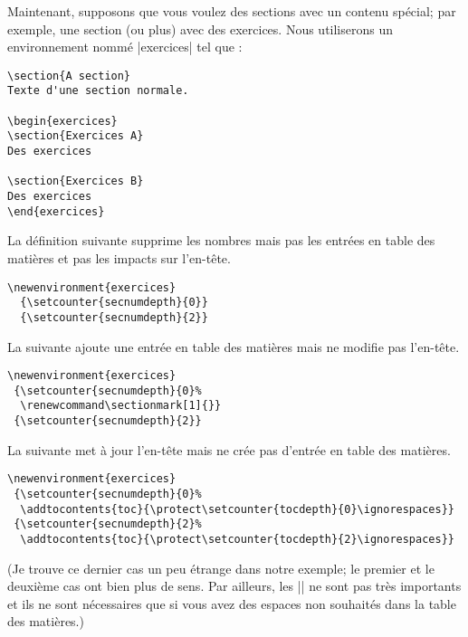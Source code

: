 \documentclass[a4paper]{ltxguide}
\begin{document}
Maintenant, supposons que vous voulez des sections avec un contenu spécial; par exemple,
une section (ou plus) avec des exercices. Nous utiliserons un environnement nommé
|exercices| tel que : 
\begin{verbatim}
\section{A section}
Texte d'une section normale.

\begin{exercices}
\section{Exercices A}
Des exercices

\section{Exercices B}
Des exercices
\end{exercices}
\end{verbatim}

La définition suivante supprime les nombres mais pas les entrées en table des 
matières et pas les impacts sur l'en-tête.
\begin{verbatim}
\newenvironment{exercices}
  {\setcounter{secnumdepth}{0}}
  {\setcounter{secnumdepth}{2}}
\end{verbatim}

La suivante ajoute une entrée en table des matières mais ne modifie pas l'en-tête.
\begin{verbatim}
\newenvironment{exercices}
 {\setcounter{secnumdepth}{0}%
  \renewcommand\sectionmark[1]{}}
 {\setcounter{secnumdepth}{2}}
\end{verbatim}

La suivante met à jour l'en-tête mais ne crée pas d'entrée en table des matières.
\begin{verbatim}
\newenvironment{exercices}
 {\setcounter{secnumdepth}{0}%
  \addtocontents{toc}{\protect\setcounter{tocdepth}{0}\ignorespaces}}
 {\setcounter{secnumdepth}{2}%
  \addtocontents{toc}{\protect\setcounter{tocdepth}{2}\ignorespaces}}
\end{verbatim}
(Je trouve ce dernier cas un peu étrange dans notre exemple; le premier et le deuxième 
cas ont bien plus de sens. Par ailleurs, les |\ignorespaces| ne sont pas très importants et 
ils ne sont nécessaires que si vous avez des espaces non souhaités dans la table des 
matières.) 
\end{document}
